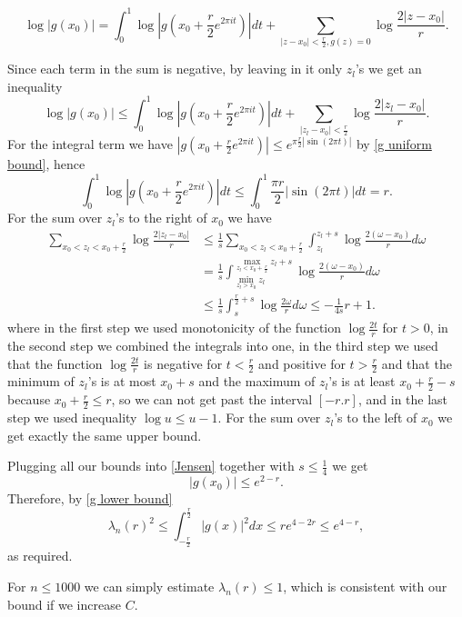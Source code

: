 \documentclass[12pt]{amsart}
\numberwithin{equation}{section}
\begin{document}
$$\log |g(x_0)| = \int_0^1 \log \left|g\left(x_0 + \frac{r}{2}e^{2\pi i t}\right)\right|dt + \sum_{|z-x_0| < \frac{r}{2}, g(z)=0} \log \frac{2|z-x_0|}{r}.$$

Since each term in the sum is negative, by leaving in it only $z_l$'s we get an inequality
\begin{equation}\label{Jensen}
\log |g(x_0)| \le \int_0^1 \log \left|g\left(x_0 + \frac{r}{2}e^{2\pi i t}\right)\right|dt + \sum_{|z_l-x_0| < \frac{r}{2}} \log \frac{2|z_l-x_0|}{r}.
\end{equation}
For the integral term we have $\left|g\left(x_0 + \frac{r}{2}e^{2\pi i t}\right)\right| \le e^{\pi \frac{r}{2}|\sin(2\pi t)|}$ by \eqref{g uniform bound}, hence 
$$\int_0^1 \log \left|g\left(x_0 + \frac{r}{2}e^{2\pi i t}\right)\right|dt \le \int_0^1\frac{\pi r}{2} |\sin(2\pi t)|dt = r.$$
For the sum over $z_l$'s to the right of $x_0$ we have
\begin{align*}
\sum_{x_0 < z_l< x_0 + \frac{r}{2}} \log \frac{2|z_l-x_0|}{r} &\leq \frac{1}{s} \sum_{x_0 < z_l< x_0 + \frac{r}{2}} \int_{z_l}^{z_l + s}  \log \frac{2(\omega-x_0)}{r} d\omega \\
&= \frac{1}{s}\int_{\min\limits_{z_l > x_0} z_l}^{\max\limits_{z_l < x_0+\frac{r}{2}} z_l+s} \log \frac{2(\omega-x_0)}{r} d\omega \\
&\le\frac{1}{s}\int_{s}^{\frac{r}{2}+s}  \log \frac{2\omega}{r} d\omega \leq - \frac{1}{4s} r + 1.
\end{align*}
where in the first step we used monotonicity of the function $\log \frac{2t}{r}$ for $t > 0$, in the second step we combined the integrals into one, in the third step we used that the function $\log \frac{2t}{r}$ is negative for $t < \frac{r}{2}$ and positive for $t > \frac{r}{2}$ and that the minimum of $z_l$'s is at most $x_0+s$ and the maximum of $z_l$'s is at least $x_0+\frac{r}{2}-s$ because $x_0 + \frac{r}{2} \le r$, so we can not get past the interval $[-r.r]$, and in  the last step we used inequality $\log u \le u-1$. For the sum over $z_l$'s to the left of $x_0$ we get exactly the same upper bound. 

Plugging all our bounds into \eqref{Jensen} together with $s\le \frac{1}{4}$ we get
$$|g(x_0)|\le e^{2-r}.$$
Therefore, by \eqref{g lower bound}
$$\lambda_n(r)^2\le\int_{-\frac{r}{2}}^\frac{r}{2} |g(x)|^2dx \le re^{4-2r} \le e^{4-r},$$
as required. 

For $n \le 1000$ we can simply estimate $\lambda_n(r) \le 1$, which is consistent with our bound if we increase $C$.
\end{document}
